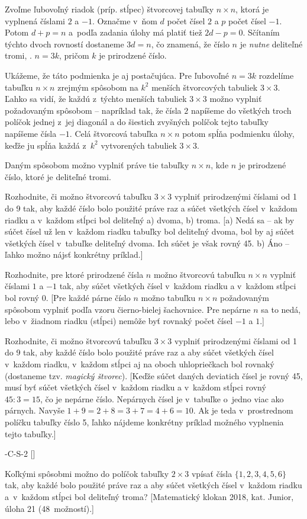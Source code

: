 {%
Zvoľme ľubovoľný riadok (príp. stĺpec) štvorcovej
tabuľky $n\times n$, ktorá je vyplnená číslami $2$ a ${-1}$.
Označme v~ňom $d$ počet čísel $2$ a $p$ počet čísel ${-1}$.
Potom $d+p=n$ a~podľa zadania úlohy má platiť tiež $2d-p=0$.
Sčítaním týchto dvoch rovností dostaneme $3d=n$,
čo znamená, že číslo $n$ je {\it nutne\/} deliteľné tromi, \tj. $n=3k$,
pričom $k$ je prirodzené číslo.

Ukážeme, že táto podmienka je aj postačujúca. Pre ľubovoľné $n=3k$
rozdelíme tabuľku $n\times n$ zrejmým spôsobom na $k^2$ menších
štvorcových tabuliek $3\times 3$.
Ľahko sa vidí, že každú z~týchto menších tabuliek $3\times 3$ možno
vyplniť požadovaným spôsobom -- napríklad tak, že čísla $2$ napíšeme do
všetkých troch políčok jednej z~jej diagonál a do šiestich zvyšných políčok
tejto tabuľky napíšeme čísla ${-1}$. Celá štvorcová tabuľka $n\times n$ potom
spĺňa podmienku úlohy, keďže ju spĺňa každá z~$k^2$
vytvorených tabuliek $3\times3$.

\Zav
Daným spôsobom možno vyplniť práve tie tabuľky $n\times n$,
kde $n$ je prirodzené číslo, ktoré je deliteľné tromi.


Rozhodnite, či možno štvorcovú tabuľku $3\times 3$ vyplniť
prirodzenými číslami od 1 do 9 tak, aby každé číslo bolo použité práve
raz a súčet všetkých čísel v~každom riadku a v~každom stĺpci bol
deliteľný a) dvoma, b) troma.
[a) Nedá sa -- ak by súčet čísel už len v~každom riadku tabuľky
bol deliteľný dvoma, bol by aj súčet všetkých čísel v~tabuľke deliteľný dvoma.
Ich súčet je však rovný 45. b) Áno -- ľahko možno nájsť konkrétny príklad.]

Rozhodnite, pre ktoré prirodzené čísla $n$ možno štvorcovú
tabuľku $n\times n$ vyplniť číslami $1$ a ${-1}$ tak, aby súčet všetkých
čísel v~každom riadku a v~každom stĺpci bol rovný $0$.
[Pre každé párne číslo $n$ možno tabuľku $n\times n$ požadovaným spôsobom vyplniť
podľa vzoru čierno-bielej šachovnice. Pre nepárne $n$ sa to nedá, lebo
v~žiadnom riadku (stĺpci) nemôže byť rovnaký počet čísel ${-1}$ a $1$.]

Rozhodnite, či možno štvorcovú tabuľku $3\times 3$
vyplniť prirodzenými číslami od 1 do 9 tak, aby každé číslo bolo použité práve
raz a aby súčet všetkých čísel v~každom riadku, v~každom stĺpci
aj na oboch uhlopriečkach bol rovnaký (dostaneme tzv. {\it magický štvorec}).
[Keďže súčet daných deviatich čísel je rovný 45,
musí byť súčet všetkých čísel v~každom riadku a v~každom stĺpci rovný
$45:3=15$, čo je nepárne číslo. Nepárnych čísel je v~tabuľke
o~jedno viac ako párnych. Navyše $1+9=2+8=3+7=4+6=10$.
Ak je teda v~prostrednom políčku tabuľky číslo 5, ľahko
nájdeme konkrétny príklad možného vyplnenia tejto tabuľky.]

\DOP
{}-C-S-2
[]

Koľkými spôsobmi možno do políčok tabuľky $2\times 3$ vpísať
čísla $\{1,2,3,4,5,6\}$ tak, aby každé bolo použité práve raz a aby
súčet všetkých čísel v~každom riadku a~v~každom stĺpci bol deliteľný troma?
[Matematický klokan 2018, kat. Junior, úloha 21 (48~možností).]

}

